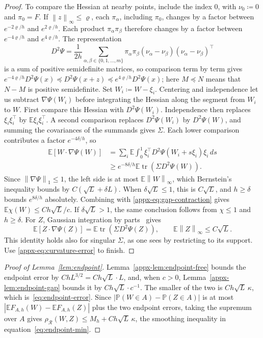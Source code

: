 \documentclass[11pt,letterpaper]{article}
\theoremstyle{remark}
\newcommand{\E}{\mathbb E}
\newcommand{\Pp}{\mathbb P}
\newcommand{\tr}{\operatorname{tr}}
\newcommand{\norm}[1]{\left\lVert#1\right\rVert}
\newcommand{\rh}{\rho_{\mathcal R}}
\newcommand{\dd}{\,d}
\begin{document}
\begin{proof}
To compare the Hessian at nearby points, include the index \(0\), with
\(\nu_0\coloneqq 0\) and \(\pi_0=F\). If \(\norm z_\infty\le\varrho\),
each \(\pi_\alpha\), including \(\pi_0\), changes by a factor between
\(e^{-2\varrho/h}\) and \(e^{2\varrho/h}\). Each product
\(\pi_\alpha\pi_\beta\) therefore changes by a factor between
\(e^{-4\varrho/h}\) and \(e^{4\varrho/h}\). The representation
\[
 D^2\Psi=\frac1{2h}\sum_{\alpha,\beta\in\{0,1,\ldots,m\}}
 \pi_\alpha\pi_\beta
 (\nu_\alpha-\nu_\beta)(\nu_\alpha-\nu_\beta)^\top
\]
is a sum of positive semidefinite matrices, so comparison term by term gives
\(e^{-4\varrho/h}D^2\Psi(x)\preceq D^2\Psi(x+z)
\preceq e^{4\varrho/h}D^2\Psi(x)\);
here \(M\preceq N\) means that \(N-M\) is positive semidefinite.
Set \(W_i\coloneqq W-\xi_i\). Centering and independence let us subtract
\(\nabla\Psi(W_i)\) before integrating the Hessian along the segment
from \(W_i\) to \(W\). First compare this Hessian with
\(D^2\Psi(W_i)\). Independence then replaces
\(\xi_i\xi_i^\top\) by \(\E\xi_i\xi_i^\top\). A second comparison
replaces \(D^2\Psi(W_i)\) by \(D^2\Psi(W)\), and summing the covariances of the
summands gives \(\Sigma\). Each lower comparison contributes a factor
\(e^{-4\delta/h}\), so
\[
 \begin{split}
 \E[W\cdot\nabla\Psi(W)]
 &=\sum_i\E\int_0^1
 \xi_i^\top D^2\Psi(W_i+s\xi_i)\xi_i\dd s\\
 &\ge e^{-8\delta/h}\E\tr(\Sigma D^2\Psi(W)).
 \end{split}
\]
Since \(\norm{\nabla\Psi}_1\le1\), the left side is at most
\(\E\norm W_\infty\), which Bernstein's inequality bounds by
\(C(\sqrt L+\delta L)\). When \(\delta\sqrt L\le1\), this is
\(C\sqrt L\), and \(h\ge\delta\) bounds \(e^{8\delta/h}\)
absolutely. Combining with \eqref{appx-eq:gap-contraction} gives
\(\E\chi(W)\le Ch\sqrt L/c\).
If \(\delta\sqrt L>1\), the same conclusion follows from
\(\chi\le1\) and \(h\ge\delta\).
For \(Z\), Gaussian integration by parts~\cite{Stein1981} gives
\[
 \E[Z\cdot\nabla\Psi(Z)]
 =\E\tr(\Sigma D^2\Psi(Z)),\qquad
 \E\norm Z_\infty\le C\sqrt L.
\]
This identity holds also for singular \(\Sigma\), as one sees by
restricting to its support. Use \eqref{appx-eq:curvature-error} to finish.
\end{proof}

\begin{proof}[Proof of Lemma~\ref{lem:endpoint}]
Lemma~\ref{appx-lem:endpoint-free} bounds the endpoint error by
\(ChL^{3/2}=Ch\sqrt L\cdot L\), and, when \(c>0\),
Lemma~\ref{appx-lem:endpoint-gap} bounds it by \(Ch\sqrt L\cdot c^{-1}\).
The smaller of the two is \(Ch\sqrt L\,\kappa\), which
is~\eqref{eq:endpoint-error}. Since
\(|\Pp(W\in A)-\Pp(Z\in A)|\) is at most
\(|\E F_{A,h}(W)-\E F_{A,h}(Z)|\) plus the two endpoint errors,
taking the supremum over \(A\) gives
\(\rh(W,Z)\le M_h+Ch\sqrt L\,\kappa\), the smoothing inequality
in equation~\eqref{eq:endpoint-min}.
\end{proof}
\end{document}
